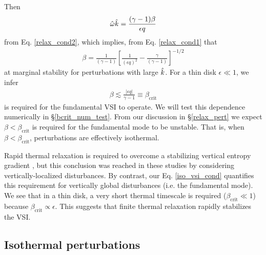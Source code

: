 Then
\begin{align}
  \hat{\omega}\hat{k} = \frac{(\gamma-1)\beta}{\epsilon q}
\end{align}
from Eq. \ref{relax_cond2}, which implies, from Eq. \ref{relax_cond1}
that
\begin{align}
  \beta = \frac{1}{(\gamma-1)}\left[\frac{1}{\left(\epsilon
        q\right)^2} - \frac{\gamma}{(\gamma-1)}\right]^{-1/2} 
\end{align}
at marginal stability for perturbations with large $\hat{k}$. 
For a thin disk $\epsilon\ll 1$, we infer 
\begin{align}\label{iso_vsi_cond}
  \beta \lesssim \frac{|\epsilon q|}{\gamma-1} \equiv
  \beta_\mathrm{crit} 
\end{align}
is required for the fundamental VSI to operate. We will test this
dependence numerically in \S\ref{bcrit_num_test}. 
From our discussion in \S\ref{relax_pert} we expect   
$\beta<\beta_\mathrm{crit}$ is required for the fundamental mode to be
unstable. That is, when $\beta<\beta_\mathrm{crit}$, perturbations are 
effectively isothermal. 

Rapid thermal relaxation is required to overcome a stabilizing
vertical entropy gradient \citep{goldreich67,urpin98,urpin03}, but
this conclusion was reached in these studies by considering
vertically-localized disturbances. %
By contrast, our Eq. \ref{iso_vsi_cond} quantifies this requirement
for vertically global disturbances (i.e. the fundamental mode). We see
that in a thin disk, a very short thermal timescale
 is required ($\beta_\mathrm{crit}\ll 1$) because
$\beta_\mathrm{crit}\propto \epsilon$. 
This suggests that
finite thermal relaxation rapidly stabilizes the VSI.  

\subsection{Isothermal perturbations}\label{iso_pert}







